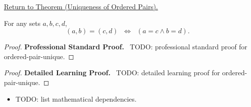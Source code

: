 \newpage
{}
\label{prf:ordered-pair-unique}

\begin{remark*}[Return]
\hyperref[thm:ordered-pair-unique]{Return to Theorem (Uniqueness of Ordered Pairs).}
\end{remark*}

\begin{theorem*}
For any sets $a,b,c,d$,
\[
(a,b) = (c,d)
\;\;\Longleftrightarrow\;\;
(a = c \land b = d).
\]
\end{theorem*}

\begin{proof}
\textbf{Professional Standard Proof.}~
TODO: professional standard proof for ordered-pair-unique.
\end{proof}

\begin{proof}
\textbf{Detailed Learning Proof.}~
TODO: detailed learning proof for ordered-pair-unique.
\end{proof}

\begin{remark*}
\end{remark*}

\begin{dependencies}
\begin{itemize}
  \item TODO: list mathematical dependencies.
\end{itemize}
\end{dependencies}

\clearpage
